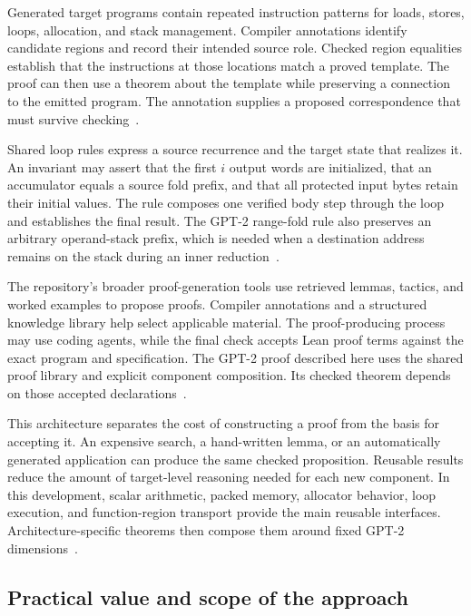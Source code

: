 Generated target programs contain repeated instruction patterns for loads, stores, loops, allocation, and stack management.  Compiler annotations identify candidate regions and record their intended source role.  Checked region equalities establish that the instructions at those locations match a proved template.  The proof can then use a theorem about the template while preserving a connection to the emitted program.  The annotation supplies a proposed correspondence that must survive checking~\cite{annotations,proof-method}.

Shared loop rules express a source recurrence and the target state that realizes it.  An invariant may assert that the first $i$ output words are initialized, that an accumulator equals a source fold prefix, and that all protected input bytes retain their initial values.  The rule composes one verified body step through the loop and establishes the final result.  The GPT-2 range-fold rule also preserves an arbitrary operand-stack prefix, which is needed when a destination address remains on the stack during an inner reduction~\cite{loops}.

The repository's broader proof-generation tools use retrieved lemmas, tactics, and worked examples to propose proofs.  Compiler annotations and a structured knowledge library help select applicable material.  The proof-producing process may use coding agents, while the final check accepts Lean proof terms against the exact program and specification.  The GPT-2 proof described here uses the shared proof library and explicit component composition.  Its checked theorem depends on those accepted declarations~\cite{proof-method,ltg,entry}.

This architecture separates the cost of constructing a proof from the basis for accepting it.  An expensive search, a hand-written lemma, or an automatically generated application can produce the same checked proposition.  Reusable results reduce the amount of target-level reasoning needed for each new component.  In this development, scalar arithmetic, packed memory, allocator behavior, loop execution, and function-region transport provide the main reusable interfaces.  Architecture-specific theorems then compose them around fixed GPT-2 dimensions~\cite{f32,packed,budget,wg-transport}.

\subsection{Practical value and scope of the approach}

